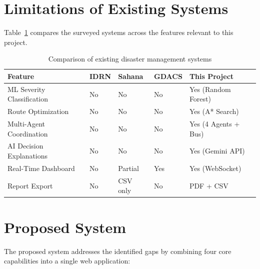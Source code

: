 \section{Limitations of Existing Systems}
\label{sec:limitations_existing}

Table~\ref{tab:existing_comparison} compares the surveyed systems across the features relevant to this project.

\begin{table}[H]
\centering
\caption{Comparison of existing disaster management systems}
\label{tab:existing_comparison}
\begin{tabularx}{\textwidth}{|l|X|X|X|X|}
\hline
\textbf{Feature} & \textbf{IDRN} & \textbf{Sahana} & \textbf{GDACS} & \textbf{This Project} \\
\hline
ML Severity Classification & No & No & No & Yes (Random Forest) \\
\hline
Route Optimization & No & No & No & Yes (A* Search) \\
\hline
Multi-Agent Coordination & No & No & No & Yes (4 Agents + Bus) \\
\hline
AI Decision Explanations & No & No & No & Yes (Gemini API) \\
\hline
Real-Time Dashboard & No & Partial & Yes & Yes (WebSocket) \\
\hline
Report Export & No & CSV only & No & PDF + CSV \\
\hline
\end{tabularx}
\end{table}

\section{Proposed System}
\label{sec:proposed_system}

The proposed system addresses the identified gaps by combining four core capabilities into a single web application:

